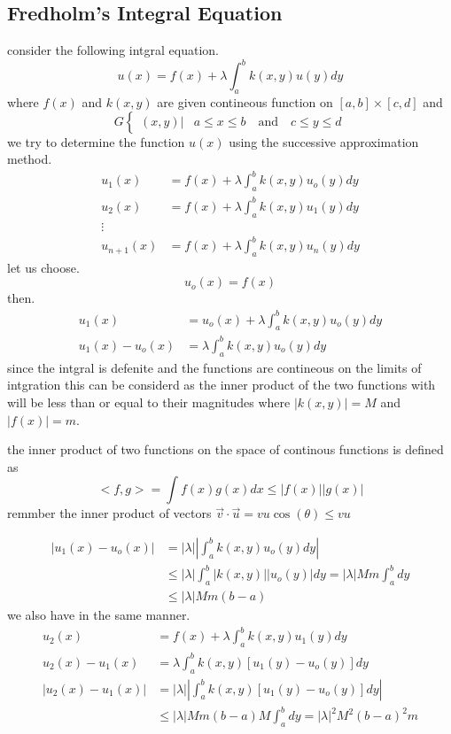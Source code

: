 \documentclass[]{article}
\begin{document}
\newpage 




\subsection{Fredholm's Integral Equation}
consider the following intgral equation.
\[
u(x) = f(x) + \lambda\int_{a}^{b} k(x,y) u(y)dy    
\]
where $f(x)$ and $k(x,y)$ are given contineous function on $[a,b]\times[c,d]$ and
\[
    G 
    \begin{cases}
    (x,y) |&     a\leq x\leq b \quad \text{and} \quad c\leq y\leq d
    \end{cases}
\]
we try to determine the function $u(x)$ using the successive approximation method.
\begin{align*}
u_1(x) &= f(x) + \lambda\int_{a}^{b} k(x,y) u_o(y)dy
\\
u_2(x) &= f(x) + \lambda\int_{a}^{b} k(x,y) u_1(y)dy
\\
\vdots
\\
u_{n+1}(x) &= f(x) + \lambda\int_{a}^{b} k(x,y) u_n(y)dy
\end{align*}
let us choose.
\[
u_o(x) = f(x)    
\]
then.
\begin{align*}
u_1(x) &= u_o(x) + \lambda\int_{a}^{b} k(x,y) u_o(y)dy
\\
u_1(x)- u_o(x) &= \lambda\int_{a}^{b} k(x,y) u_o(y)dy
\end{align*}
since the intgral is defenite and the functions are contineous on the limits of intgration 
this can be considerd as the inner product of the two functions 
with will be less than or equal to their magnitudes where $|k(x,y)| = M$ and $|f(x)| = m$.
\begin{enrichment*}{}
    the inner product of two functions on the space of continous functions is defined as 
    \[
        <f,g> = \int f(x)g(x)dx \leq |f(x)||g(x)|
    \]
     remmber the inner product of vectors $\vec{v}\cdot \vec{u} = vu \cos(\theta) \leq vu$
\end{enrichment*}
\begin{align*}
    \left|u_1(x)- u_o(x)\right| &= |\lambda|\left|\int_{a}^{b} k(x,y) u_o(y)dy\right|    
    \\
    & \leq |\lambda|\int_{a}^{b}|k(x,y)||u_o(y)|dy = |\lambda|Mm\int_{a}^{b}dy
    \\
    & \leq |\lambda|Mm(b-a)
\end{align*}
we also have in the same manner. 
\begin{align*}
u_2(x) &= f(x) + \lambda\int_{a}^{b} k(x,y) u_1(y)dy
\\
u_2(x) - u_1(x)&= \lambda\int_{a}^{b} k(x,y) [u_1(y)-u_o(y)]dy
\\
|u_2(x) - u_1(x)| &= |\lambda|\left|\int_{a}^{b} k(x,y) [u_1(y)-u_o(y)]dy\right| 
\\
&\leq |\lambda|Mm(b-a) M \int_{a}^{b}dy = |\lambda|^2M^2{(b-a)}^2 m
\end{align*}
\end{document}
